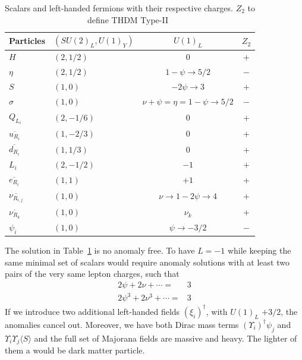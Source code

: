 \documentclass[12pt]{article}
\begin{document}
%
\begin{table}
  \centering
  \begin{tabular}{|l|l|c|c|}
    \hline  
    Particles     & $\left( SU(2)_L, U(1)_Y \right)$ & $U(1)_{L}$& $Z_2$\\ \hline
    $H $  & $(2, 1/2)$ &  0 &$+$\\
    $\eta$ & $(2,1/2)$ & $1-\psi\to 5/2$ &$-$\\
    $S$ & $(1,0)$ & $-2\psi\to 3$ &$+$\\
    $\sigma$ & $(1,0)$ & $\nu+\psi=\eta=1-\psi\to 5/2$&$-$\\
    \hline
    $Q_{L_{i}}$  & $(2,-1/6)$ & $0$& $+$\\
    $\overline{u_{R_{i}}}$ & $(1,-2/3)$ & $0$& $+$\\
    $\overline{d_{R_{i}}}$ & $(1,1/3)$ & $0$& $+$\\
    \hline
    $L_i$  & $(2,-1/2)$ & $-1$& $+$\\
    $\overline{e_{R_i}}$ & $(1,1)$ & $+1$ & $+$ \\
    $\overline{\nu_{R_{i,j}}}$ & $(1,0)$ & $\nu\to 1-2\psi\to 4$&$+$\\
    $\overline{\nu_{R_k}}$ & $(1,0)$ & $\nu_k$&$+$\\
    $\psi_{i}$  & $(1,0)$ & $\psi\to -3/2$ &$-$\\\hline
  \end{tabular}
  \caption{Scalars and left-handed fermions with their respective charges. $Z_2$ to define THDM Type-II~\cite{1303.0168}}
  \label{tab:partcont}
\end{table}
%

The solution in Table~\ref{tab:partcont} is no anomaly free. To have $L=-1$ while keeping the same minimal set of scalars would require anomaly solutions with at least two pairs of the very same lepton charges, such that
\begin{align}
    2\psi+2\nu+\cdots=&3 \nonumber\\
    2\psi^3+2\nu^3+\cdots=&3
\end{align}
If we introduce two additional left-handed fields $(\xi_i)^\dagger$,  with $U(1)_L$ $+3/2$, the anomalies cancel out. Moreover, we have both Dirac mass terms $(\Upsilon_i)^\dagger\psi_j$ and $ \Upsilon_i \Upsilon_j \langle S\rangle$ and the full set of Majorana fields are massive and heavy. The lighter of them a would be dark matter particle.
\end{document}

